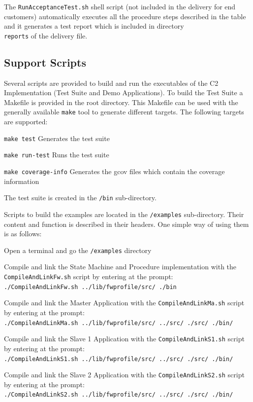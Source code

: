 \documentclass[a4paper,10pt]{article}
\newenvironment{fw_itemize}						%
{\begin{itemize}
  \setlength{\itemsep}{1mm}
  \setlength{\parskip}{0pt}
  \setlength{\parsep}{0pt}}
{\end{itemize}}
\begin{document}
The \texttt{RunAcceptanceTest.sh} shell script (not included in the delivery for end customers) automatically executes all the procedure steps described in the table and it generates a test report which is included in directory \texttt{\\reports} of the delivery file.

\subsection{Support Scripts}\label{sec:script}
Several scripts are provided to build and run the executables of the C2 Implementation (Test Suite and Demo Applications). 
To build the Test Suite a Makefile is provided in the root directory. This Makefile can be used with the generally available \texttt{make} tool to generate different targets. The following targets are supported:

\begin{fw_itemize}
\item \texttt{make test} Generates the test suite
\item \texttt{make run-test} Runs the test suite
\item \texttt{make coverage-info} Generates the gcov files which contain the coverage information
\end{fw_itemize}

The test suite is created in the \texttt{/bin} sub-directory.

Scripts to build the examples are located in the \texttt{/examples} sub-directory. Their content and function is described in their headers. One simple way of using them is as follows:

\begin{fw_itemize}
\item Open a terminal and go the \texttt{/examples} directory
\item Compile and link the State Machine and Procedure implementation with the \texttt{CompileAndLinkFw.sh} script by entering at the prompt:\\ \texttt{./CompileAndLinkFw.sh ../lib/fwprofile/src/ ./bin}
\item Compile and link the Master Application with the \texttt{CompileAndLinkMa.sh} script by entering at the prompt:\\ \texttt{./CompileAndLinkMa.sh ../lib/fwprofile/src/ ../src/ ./src/ ./bin/}
\item Compile and link the Slave 1 Application with the \texttt{CompileAndLinkS1.sh} script by entering at the prompt:\\ \texttt{./CompileAndLinkS1.sh ../lib/fwprofile/src/ ../src/ ./src/ ./bin/}
\item Compile and link the Slave 2 Application with the \texttt{CompileAndLinkS2.sh} script by entering at the prompt:\\ \texttt{./CompileAndLinkS2.sh ../lib/fwprofile/src/ ../src/ ./src/ ./bin/}
\end{fw_itemize}
\end{document}
